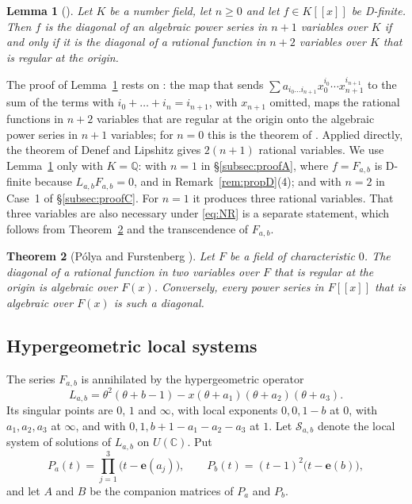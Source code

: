 \documentclass[11pt]{amsart}
\newtheorem{theorem}{Theorem}[section]
\newtheorem{lemma}[theorem]{Lemma}
\theoremstyle{definition}
\theoremstyle{remark}
\numberwithin{equation}{section}
\newcommand{\Q}{\mathbb{Q}}
\newcommand{\C}{\mathbb{C}}
\newcommand{\e}{\mathbf{e}}
\newcommand{\cS}{\mathcal{S}}
\newcommand{\Fab}{F_{a,b}}
\newcommand{\Sab}{\cS_{a,b}}
\begin{document}
\begin{lemma}[{\citet[Lemma~3.2]{HarderKramerMiller2026}}]\label{lem:HKM}
Let $K$ be a number field, let $n\ge0$ and let $f\in K[[x]]$ be D-finite. Then $f$ is the diagonal of an algebraic power series in $n+1$ variables over $K$ if and only if it is the diagonal of a rational function in $n+2$ variables over $K$ that is regular at the origin.
\end{lemma}

The proof of Lemma~\ref{lem:HKM} rests on \citet[Theorem~6.2 and Remark~6.4]{DenefLipshitz1987}: the map that sends $\sum a_{i_0\dots i_{n+1}}x_0^{i_0}\cdots x_{n+1}^{i_{n+1}}$ to the sum of the terms with $i_0+\dots+i_n=i_{n+1}$, with $x_{n+1}$ omitted, maps the rational functions in $n+2$ variables that are regular at the origin onto the algebraic power series in $n+1$ variables; for $n=0$ this is the theorem of \citet{Furstenberg1967}. Applied directly, the theorem of Denef and Lipshitz gives $2(n+1)$ rational variables. We use Lemma~\ref{lem:HKM} only with $K=\Q$: with $n=1$ in \S\ref{subsec:proofA}, where $f=\Fab$ is D-finite because $L_{a,b}\Fab=0$, and in Remark~\ref{rem:propD}(4); and with $n=2$ in Case~1 of \S\ref{subsec:proofC}. For $n=1$ it produces three rational variables. That three variables are also necessary under \eqref{eq:NR} is a separate statement, which follows from Theorem~\ref{thm:furst} and the transcendence of $\Fab$.

\begin{theorem}[{P\'olya and Furstenberg \citep{Polya1922,Furstenberg1967}}]\label{thm:furst}
Let $F$ be a field of characteristic $0$. The diagonal of a rational function in two variables over $F$ that is regular at the origin is algebraic over $F(x)$. Conversely, every power series in $F[[x]]$ that is algebraic over $F(x)$ is such a diagonal.
\end{theorem}

\subsection{Hypergeometric local systems}\label{subsec:hyp}
The series $\Fab$ is annihilated by the hypergeometric operator
\begin{equation}\label{eq:L}
L_{a,b}=\theta^2(\theta+b-1)-x(\theta+a_1)(\theta+a_2)(\theta+a_3).
\end{equation}
Its singular points are $0$, $1$ and $\infty$, with local exponents $0,0,1-b$ at $0$, with $a_1,a_2,a_3$ at $\infty$, and with $0,1,b+1-a_1-a_2-a_3$ at $1$. Let $\Sab$ denote the local system of solutions of $L_{a,b}$ on $U(\C)$. Put
\[
P_a(t)=\prod_{j=1}^3\big(t-\e(a_j)\big),\qquad P_b(t)=(t-1)^2\big(t-\e(b)\big),
\]
and let $A$ and $B$ be the companion matrices of $P_a$ and $P_b$.
\end{document}
